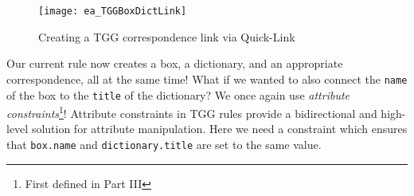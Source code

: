 \begin{enumerate}
\newpage

\begin{figure}[htbp]
\begin{center}
  \texttt{[image: ea\_TGGBoxDictLink]}
  \caption{Creating a TGG correspondence link via Quick-Link}
  \label{fig:create_tgg_correspondence_link}
\end{center}
\end{figure}

\end{enumerate}

Our current rule now creates a box, a dictionary, and an appropriate correspondence, all at the same time! What if we wanted to also connect the \texttt{name}
of the box to the \texttt{title} of the dictionary? We once again use \emph{attribute constraints}\footnote{First defined in Part III}! Attribute constraints
in TGG rules provide a bidirectional and high-level solution for attribute manipulation. Here we need a constraint which ensures that \texttt{box.name}
and \texttt{dictionary.title} are set to the same value.

